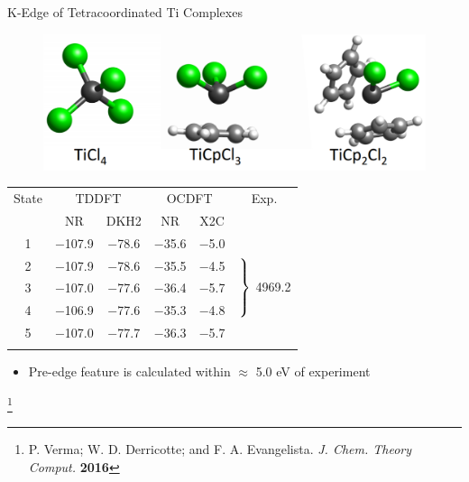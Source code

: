 \documentclass[t]{beamer}
\newcommand\blfootnote[1]{%
  \begingroup
  \renewcommand\thefootnote{}\footnote{#1}%
  \addtocounter{footnote}{-1}%
  \endgroup
}
\begin{document}
\begin{frame}{K-Edge of Tetracoordinated Ti Complexes}
\begin{figure}
\includegraphics[scale=0.3]{Ti_structs.png}
\end{figure}

\begin{table}[!t]
\footnotesize
\begin{tabular}{cccccc}
\toprule
State & \multicolumn{2}{c}{TDDFT} & \multicolumn{2}{c}{OCDFT} & Exp. \\ \cmidrule(r){2-3}  \cmidrule(l){4-5}
 & NR & DKH2 & NR & X2C  \\
\midrule
1 & $-$107.9& $-$78.6& $-$35.6& $-$5.0 & \multirow{5}{*}{$\left. \vphantom{\begin{tabular}{c}3\\3\\3 \\3\end{tabular}}\right\}$ 4969.2} \\
2 & $-$107.9& $-$78.6& $-$35.5& $-$4.5 \\
3 & $-$107.0& $-$77.6& $-$36.4& $-$5.7 \\
4 & $-$106.9& $-$77.6& $-$35.3& $-$4.8 \\
5 & $-$107.0& $-$77.7& $-$36.3& $-$5.7 \\
\bottomrule
	\label{table:Ti-complex}
\end{tabular}
\end{table}
\begin{itemize}
\item Pre-edge feature is calculated within $\approx$ 5.0 eV of experiment
\end{itemize}
\blfootnote{P. Verma; W. D. Derricotte; and F. A. Evangelista. \textit{J. Chem. Theory Comput.} \textbf{2016}}
\end{frame}
\end{document}
